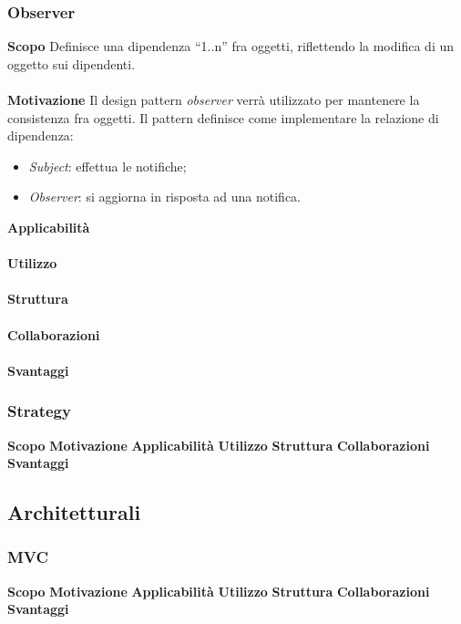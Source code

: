 \subsubsection{Observer}
\textbf{Scopo}	Definisce una dipendenza “1..n” fra oggetti, riflettendo la modifica di un oggetto sui dipendenti.
\\\\
\textbf{Motivazione}	Il design pattern \textit{observer} verrà utilizzato per mantenere la consistenza fra oggetti. Il pattern definisce come implementare la relazione di dipendenza:
	\begin{itemize}
		\item \textit{Subject}: effettua le notifiche;
		\item \textit{Observer}: si aggiorna in risposta ad una notifica.
	\end{itemize}
\textbf{Applicabilità}	
\\\\
\textbf{Utilizzo}
\\\\
\textbf{Struttura}
\\\\
\textbf{Collaborazioni}
\\\\
\textbf{Svantaggi}
\subsubsection{Strategy}
\textbf{Scopo}
\textbf{Motivazione}
\textbf{Applicabilità}
\textbf{Utilizzo}
\textbf{Struttura}
\textbf{Collaborazioni}
\textbf{Svantaggi}

\subsection{Architetturali}
\subsubsection{MVC}
\textbf{Scopo}
\textbf{Motivazione}
\textbf{Applicabilità}
\textbf{Utilizzo}
\textbf{Struttura}
\textbf{Collaborazioni}
\textbf{Svantaggi}
